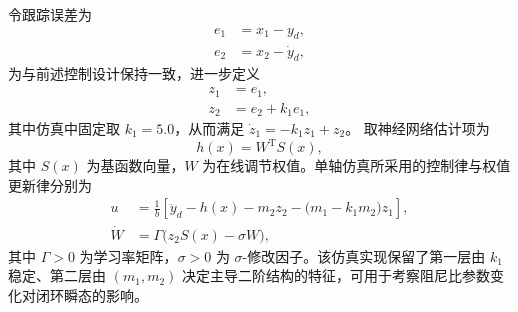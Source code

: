 令跟踪误差为
\begin{subequations}\label{eq:ch2_sim_err}
\begin{align}
e_1 &= x_1-y_d,\\
e_2 &= x_2-\dot y_d,
\end{align}
\end{subequations}
为与前述控制设计保持一致，进一步定义
\begin{subequations}\label{eq:ch2_sim_z12}
\begin{align}
z_1 &= e_1,\\
z_2 &= e_2+k_1e_1,
\end{align}
\end{subequations}
其中仿真中固定取 $k_1=5.0$，从而满足 $\dot z_1=-k_1z_1+z_2$。
取神经网络估计项为
\begin{equation}\label{eq:ch2_sim_nn}
  h(x)=W^{\mathrm T}S(x),
\end{equation}
其中 $S(x)$ 为基函数向量，$W$ 为在线调节权值。单轴仿真所采用的控制律与权值更新律分别为
\begin{subequations}
\begin{align}
u &= \frac{1}{b}\left[\ddot y_d-h(x)-m_2z_2-\bigl(m_1-k_1m_2\bigr)z_1\right], \label{eq:ch2_sim_ctrl}\\
\dot W &= \Gamma\big(z_2S(x)-\sigma W\big), \label{eq:ch2_sim_update}
\end{align}
\end{subequations}
其中 $\Gamma>0$ 为学习率矩阵，$\sigma>0$ 为 $\sigma$-修改因子。该仿真实现保留了第一层由 $k_1$ 稳定、第二层由 $(m_1,m_2)$ 决定主导二阶结构的特征，可用于考察阻尼比参数变化对闭环瞬态的影响。

